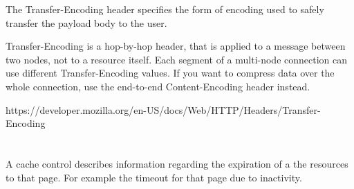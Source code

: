 \documentclass{article}
\begin{document}
	

	The Transfer-Encoding header specifies the form of encoding used to safely transfer the payload body to the user.

	Transfer-Encoding is a hop-by-hop header, that is applied to a message between two nodes, not to a resource itself. Each segment of a multi-node connection can use different Transfer-Encoding values. If you want to compress data over the whole connection, use the end-to-end Content-Encoding header instead.

	https://developer.mozilla.org/en-US/docs/Web/HTTP/Headers/Transfer-Encoding


	\section{}
	A cache control describes information regarding the expiration of a the resources to that page. For example the timeout for that page due to inactivity.
	
\end{document}
